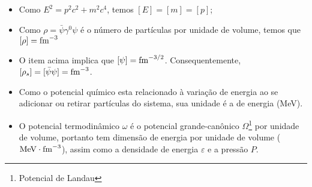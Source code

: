 \begin{itemize}
	\item Como $E^2 = p^2c^2 + m^2c^4$, temos $[E] = [m] = [p]$;
	\item Como $\rho = \bar{\psi}\gamma^0\psi$ é o número de partículas por unidade de volume, temos que $[\rho] = \rm{fm}^{-3}$
	\item O item acima implica que $[\psi] = \rm{fm}^{-3/2}$. Consequentemente, $[\rho_s] = [\bar{\psi}\psi] = \rm{fm}^{-3}$. 
	\item Como o potencial químico esta relacionado à variação de energia ao se adicionar ou retirar partículas do sistema, sua unidade é a de energia (MeV).
	\item O potencial termodinâmico $\omega$ é o potencial grande-canônico $\Omega$\footnote{Potencial de Landau} por unidade de volume, portanto tem dimensão de energia por unidade de volume ($\rm{MeV}\cdot\rm{fm}^{-3}$), assim como a densidade de energia $\varepsilon$ e a pressão $P$.
\end{itemize}

